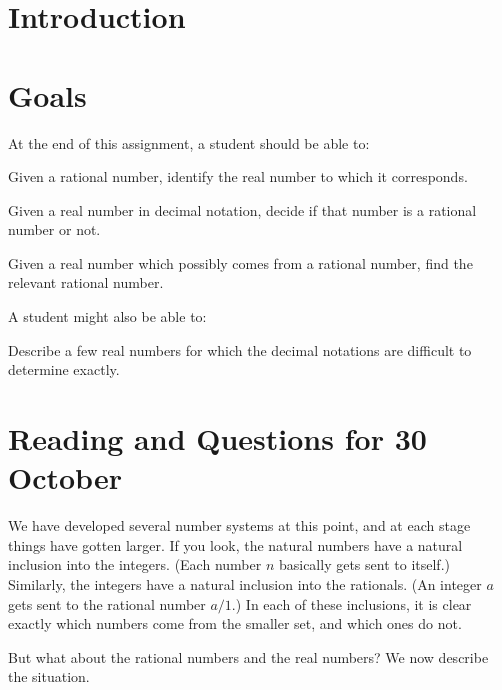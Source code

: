 \documentclass[12pt,letterpaper]{article}
\theoremstyle{definition}
\begin{document}
\setlength{\parskip}{1ex plus 0.5ex minus 0.2ex}
\setlength{\parindent}{0pt}

\pagestyle{fancy}
\cfoot{}

\section*{Introduction}


\section*{Goals}
At the end of this assignment, a student should be able to:
\begin{compactitem}
\item Given a rational number, identify the real number to which it corresponds.
\item Given a real number in decimal notation, decide if that number is a rational number or not.
\item Given a real number which possibly comes from a rational number, find the relevant rational number.
\end{compactitem}
A student might also be able to:
\begin{compactitem}
\item Describe a few real numbers for which the decimal notations are difficult to determine exactly.
\end{compactitem}

\section*{Reading and Questions for 30 October}

We have developed several number systems at this point, and at each stage things have gotten larger.
If you look, the natural numbers have a natural inclusion into the integers. 
(Each number $n$ basically gets sent to itself.)
Similarly, the integers have a natural inclusion into the rationals.
(An integer $a$ gets sent to the rational number $a/1$.)
In each of these inclusions, it is clear exactly which numbers come from the smaller set, and which ones do not.

But what about the rational numbers and the real numbers?
We now describe the situation.
\end{document}
